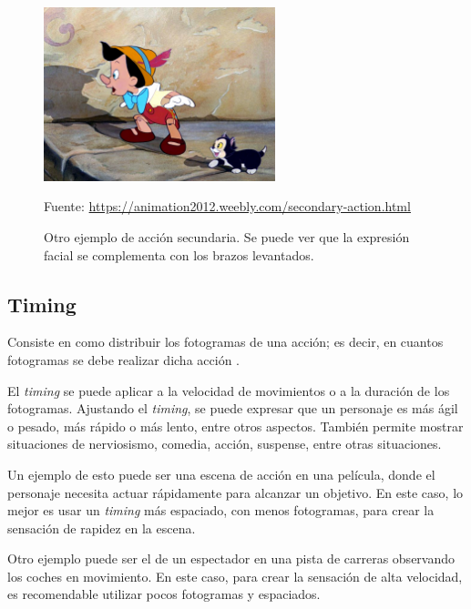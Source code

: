 \documentclass{article}
\begin{document}
\begin{figure}[H]
    \centering
    \includegraphics[width=0.6\textwidth]{imagenes/sec-ac.jpg}
    \caption{Otro ejemplo de acción secundaria. Se puede ver que la expresión facial se complementa con los brazos levantados.}
    \vspace{10pt}
    \footnotesize{Fuente: \url{https://animation2012.weebly.com/secondary-action.html}}
\end{figure}


\subsection{Timing}

Consiste en como distribuir los fotogramas de una acción; es decir, en cuantos fotogramas se debe realizar dicha acción \cite{idearocket}.

\bigskip

El \textit{timing} se puede aplicar a la velocidad de movimientos o a la duración de los fotogramas. Ajustando el \textit{timing}, se puede expresar que un personaje es más ágil o pesado, más rápido o más lento, entre otros aspectos. También permite mostrar situaciones de nerviosismo, comedia, acción, suspense, entre otras situaciones.

\bigskip

Un ejemplo de esto puede ser una escena de acción en una película, donde el personaje necesita actuar rápidamente para alcanzar un objetivo. En este caso, lo mejor es usar un \textit{timing} más espaciado, con menos fotogramas, para crear la sensación de rapidez en la escena. 

Otro ejemplo puede ser el de un espectador en una pista de carreras observando los coches en movimiento. En este caso, para crear la sensación de alta velocidad, es recomendable utilizar pocos fotogramas y espaciados.
\end{document}
